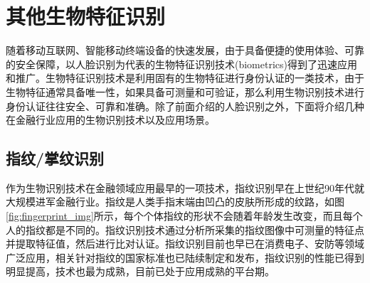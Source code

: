 %
%
%
\chapter{其他生物特征识别}
\label{basic} %

随着移动互联网、智能移动终端设备的快速发展，由于具备便捷的使用体验、可靠的安全保障，以人脸识别为代表的生物特征识别技术(biometrics)得到了迅速应用和推广。生物特征识别技术是利用固有的生物特征进行身份认证的一类技术，由于生物特征通常具备唯一性，如果具备可测量和可验证，那么利用生物识别技术进行身份认证往往安全、可靠和准确。除了前面介绍的人脸识别之外，下面将介绍几种在金融行业应用的生物识别技术以及应用场景。



\section{指纹/掌纹识别}

作为生物识别技术在金融领域应用最早的一项技术，指纹识别早在上世纪90年代就大规模进军金融行业。指纹是人类手指末端由凹凸的皮肤所形成的纹路，如图\ref{fig:fingerprint_img}所示，每个个体指纹的形状不会随着年龄发生改变，而且每个人的指纹都是不同的。指纹识别技术通过分析所采集的指纹图像中可测量的特征点并提取特征值，然后进行比对认证。指纹识别目前也早已在消费电子、安防等领域广泛应用，相关针对指纹的国家标准也已陆续制定和发布，指纹识别的性能已得到明显提高，技术也最为成熟，目前已处于应用成熟的平台期。


